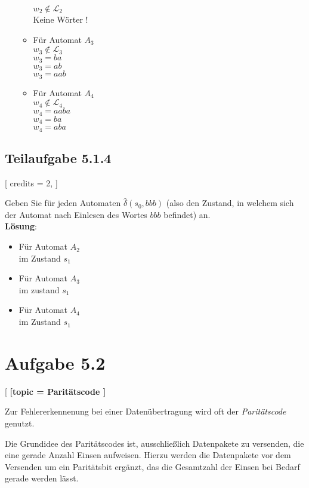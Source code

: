 \documentclass[12pt]{article}
\begin{document}
\begin{enumerate}
\begin{itemize}
$w_2 \not \in \mathcal{L}_2$\\
Keine Wörter !
\item Für Automat $A_3$\\
$w_3 \not \in \mathcal{L}_3$\\
$w_3= ba$\\
$w_3=ab$\\
$w_3=aab$ 
\item Für Automat $A_4$\\
$w_4 \not \in \mathcal{L}_4$\\
$w_4= aaba$\\
$w_4=ba$\\
$w_4=aba$ 
\end{itemize}
 \end{enumerate} 
  
  
  
  
  
 \subsection*{Teilaufgabe 5.1.4}[ 
 credits = 2, 
 ] 
  
 Geben Sie für jeden Automaten $\hat{\delta}(s_0,bbb)$ (also den Zustand, in welchem sich der Automat nach Einlesen des Wortes $bbb$ befindet) an. 
  \\
  \textbf{Lösung}:\\
  \begin{itemize}
\item Für Automat $A_2$\\
im Zustand $s_1$
\item Für Automat $A_3$\\
im zustand $s_1$
\item Für Automat $A_4$\\
im Zustand $s_1$
\end{itemize}
  
  
  
 \section*{Aufgabe 5.2}[ 
\textbf{ [topic = Paritätscode 
 ] }
  
 Zur Fehlererkennenung bei einer Datenübertragung wird oft der \emph{Paritätscode} genutzt.  
  
 Die Grundidee des Paritätscodes ist, ausschließlich Datenpakete zu versenden, die eine 
 gerade Anzahl Einsen aufweisen. Hierzu werden die Datenpakete vor dem Versenden um ein 
 Paritätsbit ergänzt, das die Gesamtzahl der Einsen bei Bedarf gerade werden lässt.  
  
\end{document}
